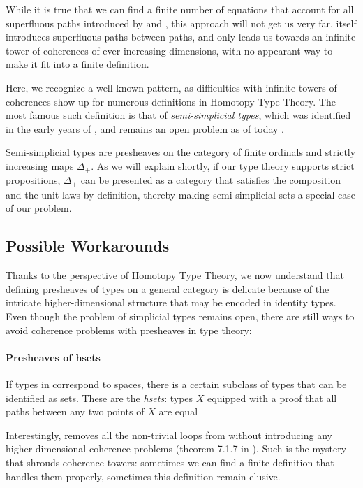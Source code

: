 While it is true that we can find a finite number of equations that account for 
all superfluous paths introduced by  and , this 
approach will not get us very far. 
% 
 itself introduces superfluous paths between paths, and only
leads us towards an infinite tower of coherences of ever increasing 
dimensions, with no appearant way to make it fit into a finite definition.

Here, we recognize a well-known pattern, as difficulties with infinite 
towers of coherences show up for numerous definitions in Homotopy Type Theory.
% 
The most famous such definition is that of \emph{semi-simplicial types}, 
which was identified in the early years of \HoTT \cite{IAS2012semisimplicial}, 
and remains an open problem as of today .

Semi-simplicial types are presheaves on the category of finite ordinals and 
strictly increasing maps \( \Delta_+ \).
% 
As we will explain shortly, if our type theory supports strict propositions,
\( \Delta_+ \) can be presented as a category that satisfies the composition
and the unit laws by definition, thereby making semi-simplicial sets a special
case of our problem.

\subsection{Possible Workarounds}

Thanks to the perspective of Homotopy Type Theory, we now understand that
defining presheaves of types on a general category is delicate because of the 
intricate higher-dimensional structure that may be encoded in identity types.
% 
Even though the problem of simplicial types remains open, there are still 
ways to avoid coherence problems with presheaves in type theory:

\paragraph{Presheaves of hsets} If types in \HoTT correspond to spaces, there 
is a certain subclass of types that can be identified as sets.
% 
These are the \emph{hsets}: types \( X \) equipped with a proof that all 
paths between any two points of \( X \) are equal


Interestingly,  removes all the non-trivial loops from 
 without introducing any higher-dimensional coherence problems 
(theorem 7.1.7 in ). 
% 
Such is the mystery that shrouds coherence towers: sometimes we can find 
a finite definition that handles them properly, sometimes this definition 
remain elusive.

